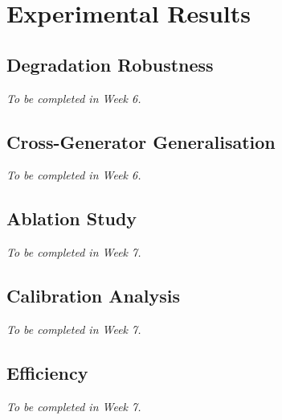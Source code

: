 
\chapter{Experimental Results}\label{chap:results}


\section{Degradation Robustness}\label{sec:degradation}
\textit{To be completed in Week 6.}

\section{Cross-Generator Generalisation}\label{sec:cross_gen}
\textit{To be completed in Week 6.}

\section{Ablation Study}\label{sec:ablation}
\textit{To be completed in Week 7.}

\section{Calibration Analysis}\label{sec:calibration_analysis}
\textit{To be completed in Week 7.}

\section{Efficiency}\label{sec:efficiency}
\textit{To be completed in Week 7.}
